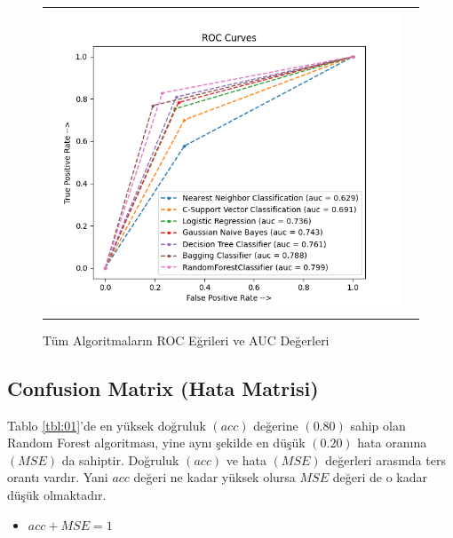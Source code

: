 \documentclass[conference]{IEEEtran}
\begin{document}
\begin{figure}[!h]
	\centering
	\begin{center}
		\begin{tabular}{cc}
			\includegraphics[scale=0.42]{pictures/pic_09.png}&
		\end{tabular}
	\end{center}
	\caption{Tüm Algoritmaların ROC Eğrileri ve AUC Değerleri}
	\label{fig:09}
\end{figure}

\subsection{\textbf{Confusion Matrix (Hata Matrisi)}}

\quad Tablo \ref{tbl:01}'de en yüksek doğruluk $(acc)$ değerine $(0.80)$ sahip olan Random Forest algoritması, yine aynı şekilde en düşük $(0.20)$ hata oranına $(MSE)$ da sahiptir. Doğruluk $(acc)$ ve hata $(MSE)$ değerleri arasında ters orantı vardır. Yani $acc$ değeri ne kadar yüksek olursa $MSE$ değeri de o kadar düşük olmaktadır.

\begin{itemize}
\item $acc + MSE = 1$
\end{itemize}
\end{document}
